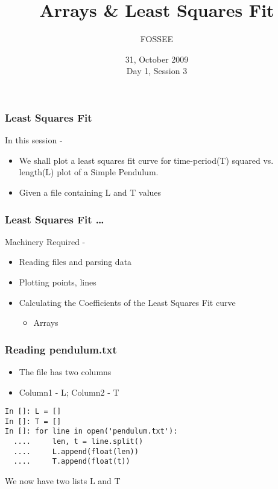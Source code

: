 \documentclass[14pt,compress]{beamer}
\title[]{Arrays \& Least Squares Fit}
\author[FOSSEE] {FOSSEE}
\institute[IIT Bombay] {Department of Aerospace Engineering\\IIT Bombay}
\date[] {31, October 2009\\Day 1, Session 3}
\newcounter{time}
\begin{document}
\begin{frame}
  \maketitle
\end{frame}


\begin{frame}
\frametitle{Least Squares Fit}
In this session - 
\begin{itemize}
\item We shall plot a least squares fit curve for time-period(T) squared vs. length(L) plot of a Simple Pendulum. 
\item Given a file containing L and T values
\end{itemize}
\end{frame}

\begin{frame}[fragile]
\frametitle{Least Squares Fit \ldots}
Machinery Required -
\begin{itemize}
\item Reading files and parsing data
\item Plotting points, lines
\item Calculating the Coefficients of the Least Squares Fit curve
\begin{itemize}
  \item Arrays
\end{itemize}
\end{itemize}
\end{frame}

\begin{frame}[fragile]
\frametitle{Reading pendulum.txt}
\begin{itemize}
  \item The file has two columns
  \item Column1 - L; Column2 - T
\end{itemize}
\begin{lstlisting}
In []: L = []
In []: T = []
In []: for line in open('pendulum.txt'):
  ....     len, t = line.split()
  ....     L.append(float(len))
  ....     T.append(float(t))
\end{lstlisting}
We now have two lists L and T
\end{frame}
\end{document}
